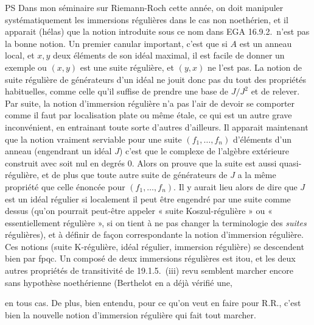 \documentclass[11pt,a4paper]{article}
\begin{document}
PS \quad Dans mon séminaire sur Riemann-Roch cette année, on doit
manipuler systématiquement les immersions régulières dans le cas
non noethérien, et il apparait (hélas) que la notion introduite sous ce nom
dans EGA 16.9.2.\ n'est pas la bonne notion. Un premier canular important,
c'est que si $A$ est un anneau local, et $x, y$ deux éléments de son idéal
maximal, il est facile de donner un exemple ou $(x, y)$ est une suite
régulière, et $(y, x)$ ne l'est pas. La notion de suite régulière de
générateurs d'un idéal ne jouit donc pas du tout des propriétés habituelles,
comme celle qu'il suffise de prendre une base de $J/J^2$ et de relever. Par
suite, la notion d'immersion régulière n'a pas l'air de devoir se comporter
comme il faut par localisation plate ou même étale, ce qui est un autre grave
inconvénient, en entrainant toute sorte d'autres d'ailleurs. Il apparait
maintenant que la notion vraiment serviable pour une suite $(f_1, \ldots, f_n)$
d'éléments d'un anneau (engendrant un idéal $J$) c'est que le complexe de
l'algèbre extérieure construit avec soit nul en degrés $0$. Alors on prouve
que la suite est aussi quasi-régulière, et de plus que toute autre suite de
 générateurs de $J$ a la même propriété que celle énoncée pour
$(f_1, \ldots, f_n)$. Il y aurait lieu alors de dire que $J$ est un idéal
régulier si localement il peut être engendré par une suite comme dessus
(qu'on pourrait peut-être appeler « suite Koszul-régulière » ou
« essentiellement régulière », si on tient à ne pas changer la terminologie
des \emph{suites} régulières), et à définir de façon correspondante la
notion d'immersion régulière. Ces notions (suite K-régulière, idéal régulier,
immersion régulière) se descendent bien par fpqc. Un composé de deux
immersions régulières est itou, et les deux autres propriétés de
transitivité de 19.1.5.\ (iii) revu semblent marcher encore sans hypothèse
noethérienne (Berthelot en a déjà vérifié une,


en tous cas. De plus, bien entendu, pour ce qu'on veut en faire pour R.R., c'est
bien la nouvelle notion d'immersion régulière qui fait tout marcher.
\end{document}
